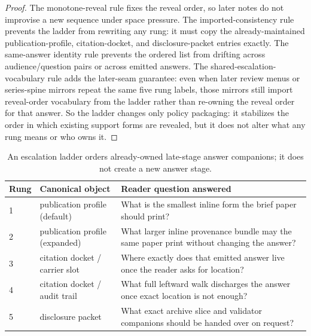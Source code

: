 \documentclass[11pt]{article}
\begin{document}
\begin{proof}
The monotone-reveal rule fixes the reveal order, so later notes do not improvise a new sequence under space pressure.
The imported-consistency rule prevents the ladder from rewriting any rung: it must copy the already-maintained publication-profile, citation-docket, and disclosure-packet entries exactly.
The same-answer identity rule prevents the ordered list from drifting across audience/question pairs or across emitted answers.
The shared-escalation-vocabulary rule adds the later-seam guarantee: even when later review menus or series-spine mirrors repeat the same five rung labels, those mirrors still import reveal-order vocabulary from the ladder rather than re-owning the reveal order for that answer.
So the ladder changes only policy packaging: it stabilizes the order in which existing support forms are revealed, but it does not alter what any rung means or who owns it.\qedhere
\end{proof}

\begin{table}[t]
\centering
\small
\begin{tabularx}{\linewidth}{@{}l l X@{}}
\toprule
Rung & Canonical object & Reader question answered \\
\midrule
1 & publication profile (default) & What is the smallest inline form the brief paper should print? \\
2 & publication profile (expanded) & What larger inline provenance bundle may the same paper print without changing the answer? \\
3 & citation docket / carrier slot & Where exactly does that emitted answer live once the reader asks for location? \\
4 & citation docket / audit trail & What full leftward walk discharges the answer once exact location is not enough? \\
5 & disclosure packet & What exact archive slice and validator companions should be handed over on request? \\
\bottomrule
\end{tabularx}
\caption{An escalation ladder orders already-owned late-stage answer companions; it does not create a new answer stage.}
\label{tab:answerescalationladder}
\end{table}
\end{document}
